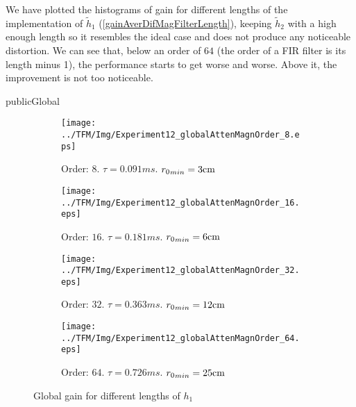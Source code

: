 We have plotted the histograms of gain for different lengths of the implementation of $\widetilde{h}_1$ (\autoref{gainAverDifMagFilterLength}), keeping $\widetilde{h}_2$ with a high enough length so it resembles the ideal case and does not produce any noticeable distortion. We can see that, below an order of $64$ (the order of a FIR filter is its length minus 1), the performance starts to get worse and worse. Above it, the improvement is not too noticeable.
\begin{shownto}{publicGlobal}
\begin{figure}[h]
	\centering
	\begin{subfigure}[b]{0.45\textwidth}
		\centering
		\texttt{[image: ../TFM/Img/Experiment12\_globalAttenMagnOrder\_8.eps]}
		\caption{Order: $8$. $\tau = 0.091 \si{ms}$. ${\distLinePrimSource}_{min} = 3\si{cm}$}
	\end{subfigure}
	\begin{subfigure}[b]{0.45\textwidth}
		\centering
		\texttt{[image: ../TFM/Img/Experiment12\_globalAttenMagnOrder\_16.eps]}
		\caption{Order: $16$. $\tau = 0.181 \si{ms}$. ${\distLinePrimSource}_{min} = 6\si{cm}$}
	\end{subfigure}
	\begin{subfigure}[b]{0.45\textwidth}
		\centering
		\texttt{[image: ../TFM/Img/Experiment12\_globalAttenMagnOrder\_32.eps]}
		\caption{Order: $32$. $\tau = 0.363 \si{ms}$. ${\distLinePrimSource}_{min} = 12\si{cm}$}
	\end{subfigure}
	\begin{subfigure}[b]{0.45\textwidth}
		\centering
		\texttt{[image: ../TFM/Img/Experiment12\_globalAttenMagnOrder\_64.eps]}
		\caption{Order: $64$. $\tau = 0.726 \si{ms}$. ${\distLinePrimSource}_{min} = 25\si{cm}$}
	\end{subfigure}
	
	\caption{Global gain for different lengths of $h_1$}
	\label{globCancDifMagFilterLength}
\end{figure}
\end{shownto}
